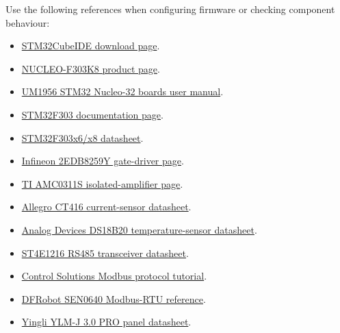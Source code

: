 \documentclass[11pt,a4paper]{article}
\begin{document}
Use the following references when configuring firmware or checking component behaviour:
\begin{itemize}
  \item \href{https://www.st.com/en/development-tools/stm32cubeide}{STM32CubeIDE download page}.
  \item \href{https://www.st.com/en/evaluation-tools/nucleo-f303k8.html}{NUCLEO-F303K8 product page}.
  \item \href{https://www.st.com/resource/en/user_manual/um1956-stm32-nucleo32-boards-mb1180-stmicroelectronics.pdf}{UM1956 STM32 Nucleo-32 boards user manual}.
  \item \href{https://www.st.com/en/microcontrollers-microprocessors/stm32f303/documentation.html}{STM32F303 documentation page}.
  \item \href{https://www.st.com/resource/en/datasheet/stm32f303c6.pdf}{STM32F303x6/x8 datasheet}.
  \item \href{https://www.infineon.com/part/2EDB8259Y}{Infineon 2EDB8259Y gate-driver page}.
  \item \href{https://www.ti.com/product/AMC0311S}{TI AMC0311S isolated-amplifier page}.
  \item \href{https://www.allegromicro.com/~/media/files/datasheets/CT416-datasheet.pdf}{Allegro CT416 current-sensor datasheet}.
  \item \href{https://www.analog.com/media/en/technical-documentation/data-sheets/ds18b20.pdf}{Analog Devices DS18B20 temperature-sensor datasheet}.
  \item \href{https://www.st.com/resource/en/datasheet/st4e1216.pdf}{ST4E1216 RS485 transceiver datasheet}.
  \item \href{https://www.csimn.com/CSI_pages/Modbus101.html}{Control Solutions Modbus protocol tutorial}.
  \item \href{https://wiki.dfrobot.com/sen0640/docs/20430}{DFRobot SEN0640 Modbus-RTU reference}.
  \item \href{https://www.offgridtec.com/media/product_attachements/YingliSolar_410W\%20YLM-J\%203.0\%20PRO_Datasheet.pdf}{Yingli YLM-J 3.0 PRO panel datasheet}.
\end{itemize}
\end{document}
